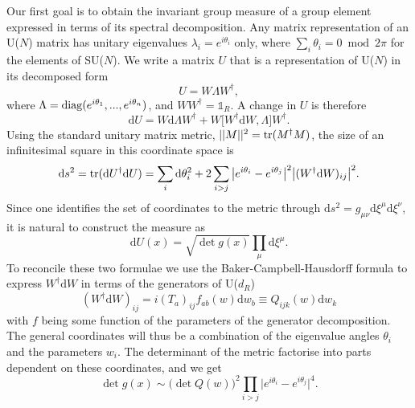 Our first goal is to obtain the invariant group measure of a group element
expressed in terms of its spectral decomposition. Any matrix representation of
an U($N$) matrix has unitary eigenvalues $\lambda_i = e^{i\theta_i}$ only, where
$\sum_i \theta_i = 0 \bmod 2\pi$ for the elements of SU($N$). We write a matrix
$U$ that is a representation of U($N$) in its decomposed form
%
\begin{equation}
  U = W \Lambda W^{\dagger},
\end{equation}
%
where $\Lambda = \operatorname{diag} (e^{i\theta_1}, ..., e^{i\theta_n})$, and $W W^{\dagger}
= \mathbb{1}_R$.  A change in $U$ is therefore
%
\begin{equation}
  \mathrm{d}U = W \mathrm{d} \Lambda W^{\dagger} +  W \big[ W^{\dagger} \mathrm{d}
  W, \Lambda \big] W^{\dagger}.
\end{equation}
%
Using the standard unitary matrix metric, $||M||^2 = \operatorname{tr}(M^{\dagger} M)$,
the size of an infinitesimal square in this coordinate space is
%
\begin{equation} \label{eq:infinitesimal-group-square}
  \mathrm{d} s^2 = \operatorname{tr} (\mathrm{d} U^{\dagger} \mathrm{d} U)
  = \sum_i \mathrm{d} \theta_i^2 + 2 \sum_{i > j}
    \big|e^{i \theta_i} - e^{i\theta_j}\big|^2
    \big| (W^{\dagger} \mathrm{d} W)_{ij} \big|^2 .
\end{equation}
%
Since one identifies the set of coordinates to the metric through
$\mathrm{d} s^2 = g_{\mu\nu} \mathrm{d} \xi^{\mu} \mathrm{d} \xi^{\nu}$,
it is natural to construct the measure as
%
\begin{equation} \label{eq:natural-group-measure}
  \mathrm{d} U(x) = \sqrt{\det g(x)} \prod_{\mu} \mathrm{d}\xi^{\mu}.
\end{equation}
%
To reconcile these two formulae we use the Baker-Campbell-Hausdorff formula to
express $W^{\dagger} \mathrm{d} W$ in terms of the generators of U($d_R$)
%
\begin{equation}
  (W^{\dagger} \mathrm{d} W)_{ij} = i (T_a)_{ij} f_{a b}(w) \mathrm{d} w_b
  \equiv Q_{ijk}(w) \mathrm{d} w_k
\end{equation}
%
with $f$ being some function of the parameters of the generator decomposition.
The general coordinates will thus be a combination of the eigenvalue angles
$\theta_i$ and the parameters $w_i$. The determinant of the metric factorise
into parts dependent on these coordinates, and we get
%
\begin{equation}
  \det g(x) \sim \big(\det Q(w)\big)^2 \prod_{i>j} \big|e^{i\theta_i} -
  e^{i\theta_j}\big|^4.
\end{equation}
